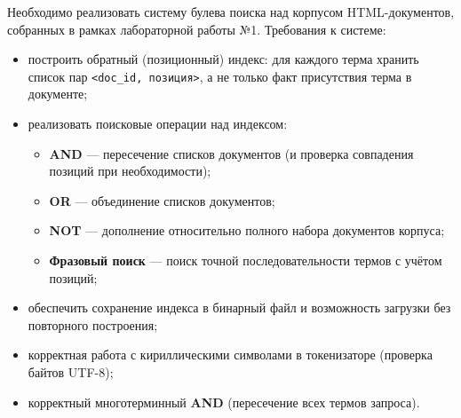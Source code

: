 
Необходимо реализовать систему булева поиска над корпусом HTML-документов, собранных в рамках лабораторной работы №1. Требования к системе:

\begin{itemize}
    \item построить обратный (позиционный) индекс: для каждого терма хранить список пар \texttt{<doc\_id, позиция>}, а не только факт присутствия терма в документе;
    \item реализовать поисковые операции над индексом:
    \begin{itemize}
        \item \textbf{AND} --- пересечение списков документов (и проверка совпадения позиций при необходимости);
        \item \textbf{OR} --- объединение списков документов;
        \item \textbf{NOT} --- дополнение относительно полного набора документов корпуса;
        \item \textbf{Фразовый поиск} --- поиск точной последовательности термов с учётом позиций;
    \end{itemize}
    \item обеспечить сохранение индекса в бинарный файл и возможность загрузки без повторного построения;
    \item корректная работа с кириллическими символами в токенизаторе (проверка байтов UTF-8);
    \item корректный многотерминный \textbf{AND} (пересечение всех термов запроса).
\end{itemize}